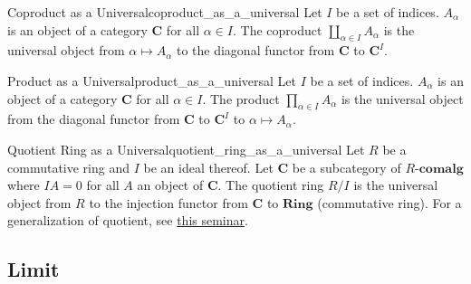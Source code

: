 \documentclass{article}
\begin{document}
\begin{example}{Coproduct as a Universal}{coproduct_as_a_universal}
    Let $I$ be a set of indices.
    $A_\alpha$ is an object of a category $\mathbf{C}$ for all $\alpha \in I$.
    The coproduct $\displaystyle \coprod_{\alpha\in I} A_\alpha$ is the universal object from $\alpha \mapsto A_\alpha$ to the diagonal functor from $\mathbf{C}$ to $\mathbf{C}^I$.
\end{example}

\begin{example}{Product as a Universal}{product_as_a_universal}
    Let $I$ be a set of indices.
    $A_\alpha$ is an object of a category $\mathbf{C}$ for all $\alpha \in I$.
    The product $\displaystyle \prod_{\alpha\in I} A_\alpha$ is the universal object from the diagonal functor from $\mathbf{C}$ to $\mathbf{C}^I$ to $\alpha \mapsto A_\alpha$.
\end{example}

\begin{example}{Quotient Ring as a Universal}{quotient_ring_as_a_universal}
    Let $R$ be a commutative ring and $I$ be an ideal thereof.
    Let $\mathbf{C}$ be a subcategory of $R$-$\mathbf{comalg}$ where $IA = 0$ for all $A$ an object of $\mathbf{C}$.
    The quotient ring $R/I$ is the universal object from $R$ to the injection functor from $\mathbf{C}$ to $\mathbf{Ring}$ (commutative ring).
    For a generalization of quotient, see \href{https://uwseminars.com/archive/ly-UPQ/}{this seminar}.
\end{example}

\subsection{Limit}
\end{document}
